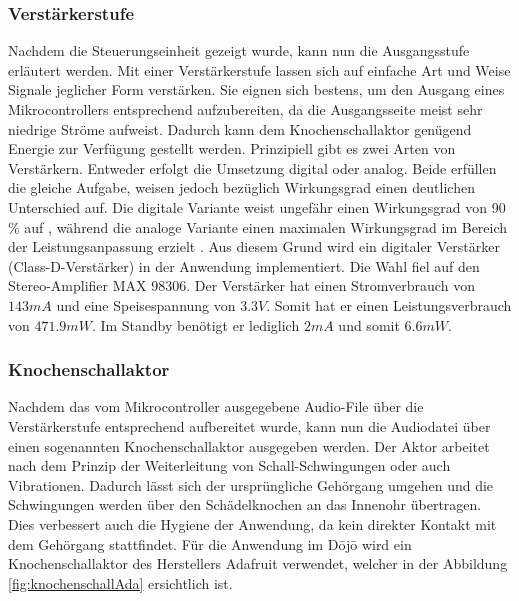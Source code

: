 \subsubsection*{Verstärkerstufe} \label{sec:verstaerkerstufe}
Nachdem die Steuerungseinheit gezeigt wurde, kann nun die Ausgangsstufe erläutert werden. Mit einer Verstärkerstufe lassen sich auf einfache Art und Weise Signale jeglicher Form verstärken. Sie eignen sich bestens, um den Ausgang eines Mikrocontrollers entsprechend aufzubereiten, da die Ausgangsseite meist sehr niedrige Ströme aufweist. Dadurch kann dem Knochenschallaktor genügend Energie zur Verfügung gestellt werden. Prinzipiell gibt es zwei Arten von Verstärkern. Entweder erfolgt die Umsetzung digital oder analog. Beide erfüllen die gleiche Aufgabe, weisen jedoch bezüglich Wirkungsgrad einen deutlichen Unterschied auf. Die digitale Variante weist ungefähr einen Wirkungsgrad von 90$\%$ auf \cite{BoneConductorAdafruit}, während die analoge Variante einen maximalen Wirkungsgrad im Bereich der Leistungsanpassung erzielt \cite{Niklaus_Skript}. Aus diesem Grund wird ein digitaler Verstärker (Class-D-Verstärker) in der Anwendung implementiert. Die Wahl fiel auf den Stereo-Amplifier MAX 98306. Der Verstärker hat einen Stromverbrauch von $143mA$ und eine Speisespannung von $3.3V$. Somit hat er einen Leistungsverbrauch von $471.9 mW$. Im Standby benötigt er lediglich $2 mA$ und somit $6.6 mW$\cite{Verstaerker}.


\subsubsection*{Knochenschallaktor} \label{sec:knochenschallaktor}
Nachdem das vom Mikrocontroller ausgegebene Audio-File über die Verstärkerstufe entsprechend aufbereitet wurde, kann nun die Audiodatei über einen sogenannten Knochenschallaktor ausgegeben werden.
Der Aktor arbeitet nach dem Prinzip der Weiterleitung von Schall-Schwingungen oder auch Vibrationen. Dadurch lässt sich der ursprüngliche Gehörgang umgehen und die Schwingungen werden über den Schädelknochen an das Innenohr übertragen. Dies verbessert auch die Hygiene der Anwendung, da kein direkter Kontakt mit dem Gehörgang stattfindet.\cite{Knochenschall}
Für die Anwendung im Dōjō wird ein Knochenschallaktor des Herstellers Adafruit verwendet, welcher in der Abbildung \ref{fig:knochenschallAda} ersichtlich ist.

